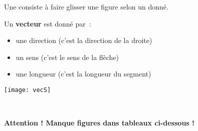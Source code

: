 

\begin{aconnaitre}
Une  consiste à faire glisser une figure selon un  donné.\\[0.5em]
\begin{minipage}[c]{0.58\linewidth}
Un \textbf{vecteur} est donné par :
\begin{itemize}
 \item une direction (c'est la direction de la droite)
 \item un sens (c'est le sens de la flèche)
 \item une longueur (c'est la longueur du segment)
 \end{itemize}
 \end{minipage} \hfill%
 \begin{minipage}[c]{0.38\linewidth}
 \begin{center} \texttt{[image: vecS]} \end{center}
 \end{minipage} \\
\end{aconnaitre}

{\Huge \textbf{Attention ! Manque figures dans tableaux ci-dessous !}}

